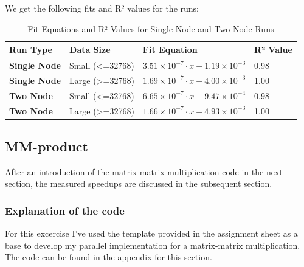 We get the following fits and R² values for the runs:
\begin{table}[h!]
    \centering
    \begin{tabular}{|l|l|l|l|}
        \hline
        \textbf{Run Type}   & \textbf{Data Size} & \textbf{Fit Equation}                                      & \textbf{R² Value} \\ \hline
        \textbf{Single Node} & Small (<=32768)  & $3.51 \times 10^{-7} \cdot x + 1.19 \times 10^{-3}$        & 0.98              \\ \hline
        \textbf{Single Node} & Large (>=32768)  & $1.69 \times 10^{-7} \cdot x + 4.00 \times 10^{-3}$        & 1.00              \\ \hline
        \textbf{Two Node}    & Small (<=32768)  & $6.65 \times 10^{-7} \cdot x + 9.47 \times 10^{-4}$        & 0.98              \\ \hline
        \textbf{Two Node}    & Large (>=32768)  & $1.66 \times 10^{-7} \cdot x + 4.93 \times 10^{-3}$        & 1.00              \\ \hline
    \end{tabular}
    \caption{Fit Equations and R² Values for Single Node and Two Node Runs}
\end{table}




\subsection{MM-product}
After an introduction of the matrix-matrix multiplication code in the next section, the measured speedups are discussed in the subsequent section.
\subsubsection*{Explanation of the code}
For this excercise I've used the template provided in the assignment sheet as a base to develop my parallel implementation for a matrix-matrix multiplication. The code can be found in the appendix for this section. \\

